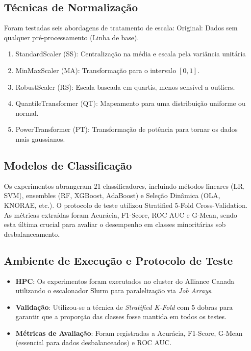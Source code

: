 \subsection{Técnicas de Normalização}

Foram testadas seis abordagens de tratamento de escala:
Original: Dados sem qualquer pré-processamento (Linha de base).

\begin{enumerate}
\item StandardScaler (SS): Centralização na média e escala pela variância unitária
\item MinMaxScaler (MA): Transformação para o intervalo $[0, 1]$.
\item RobustScaler (RS): Escala baseada em quartis, menos sensível a outliers.
\item QuantileTransformer (QT): Mapeamento para uma distribuição uniforme ou normal.
\item PowerTransformer (PT): Transformação de potência para tornar os dados mais gaussianos.
\end{enumerate}

\subsection{Modelos de Classificação}

Os experimentos abrangeram 21 classificadores, incluindo métodos lineares (LR, SVM), ensembles (RF, XGBoost, AdaBoost) e Seleção Dinâmica (OLA, KNORAE, etc.). O protocolo de teste utilizou Stratified 5-Fold Cross-Validation. As métricas extraídas foram Acurácia, F1-Score, ROC AUC e G-Mean, sendo esta última crucial para avaliar o desempenho em classes minoritárias sob desbalanceamento.

\subsection{Ambiente de Execução e Protocolo de Teste}

\begin{itemize}
    \item \textbf{HPC}: Os experimentos foram executados no cluster do Alliance Canada utilizando o escalonador Slurm para paralelização via \textit{Job Arrays}.
    \item \textbf{Validação}: Utilizou-se a técnica de \textit{Stratified K-Fold} com 5 dobras para garantir que a proporção das classes fosse mantida em todos os testes.
    \item \textbf{Métricas de Avaliação}: Foram registradas a Acurácia, F1-Score, G-Mean (essencial para dados desbalanceados) e ROC AUC.
\end{itemize}
 
